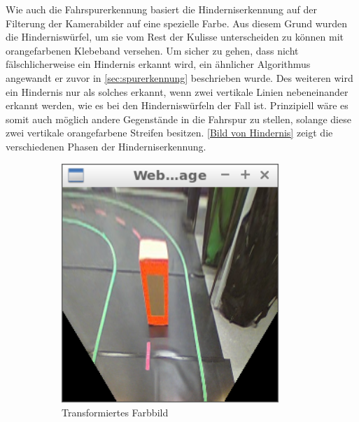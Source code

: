 Wie auch die Fahrspurerkennung basiert die Hinderniserkennung auf der Filterung der Kamerabilder auf eine spezielle Farbe. Aus diesem Grund wurden die Hinderniswürfel, um sie vom Rest der Kulisse unterscheiden zu können mit orangefarbenen Klebeband versehen. Um sicher zu gehen, dass nicht fälschlicherweise ein Hindernis erkannt wird, ein ähnlicher Algorithmus angewandt er zuvor in \autoref{sec:spurerkennung} beschrieben wurde. Des weiteren wird ein Hindernis nur als solches erkannt, wenn zwei vertikale Linien nebeneinander erkannt werden, wie es bei den Hinderniswürfeln der Fall ist. Prinzipiell wäre es somit auch möglich andere Gegenstände in die Fahrspur zu stellen, solange diese zwei vertikale orangefarbene Streifen besitzen. \autoref{Bild von Hindernis} zeigt die verschiedenen Phasen der Hinderniserkennung.

\begin{figure}
	\centering
	\begin{subfigure}{0.45\textwidth}
		\centering
		\includegraphics[width=0.9\textwidth]{images/obstacle_original.png}
		\caption{Transformiertes Farbbild}
	\end{subfigure}
	\begin{subfigure}{0.45\textwidth}
		\centering

\end{subfigure}
\end{figure}
